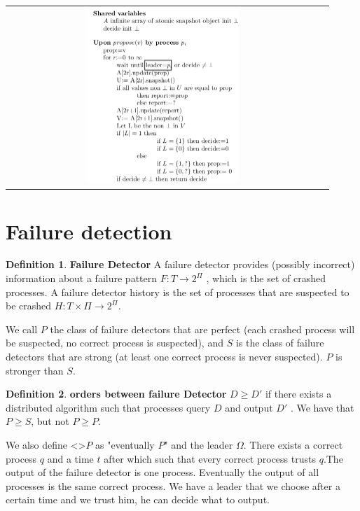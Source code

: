 \documentclass{article}
\theoremstyle{definition}
\newtheorem{definition}{Definition}[section]
\begin{document}
\begin{center}
\begin{tabular}{c c}
\includegraphics[width=0.5\textwidth]{leader_agree_ex}
\end{tabular}
\end{center}


\section{Failure detection}

\begin{definition}\textbf{Failure Detector}
A failure detector provides (possibly incorrect) information about a failure pattern $F : T \rightarrow 2^\Pi$ ,
which is the set of crashed processes. A failure detector history is the set of processes that are
suspected to be crashed $H : T \times \Pi \rightarrow 2^\Pi$.

We call $P$ the class of failure detectors that are perfect (each crashed process will be suspected, no correct process is suspected), and $S$ is the class of failure detectors that are strong (at least one correct process is never suspected). $P$ is stronger than $S$.
\end{definition}

\begin{definition}\textbf{orders between failure Detector}
$D \geq D'$ if there exists a distributed algorithm such that processes query $D$ and output $D'$ . We
have that $P \geq S$, but not $P \geq P$.
\end{definition}

We also define <>$P$ as  "eventually $P$" and the leader $\Omega$. There exists a correct process $q$ and a time $t$ after which such that every correct process trusts $q$.The output of the failure detector is one process. Eventually the output of all processes is the same correct process. We have a leader that we choose after a certain time and we trust him, he can decide what to output.
\end{document}
